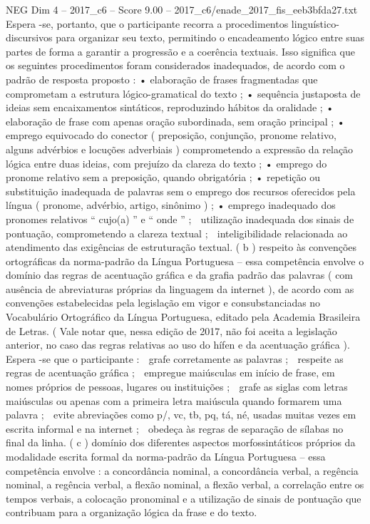 \begin{textsample}{NEG Dim 4 – 2017\_c6 – Score 9.00 – 2017\_c6/enade\_2017\_fis\_eeb3bfda27.txt}
Espera -se, portanto, que o participante recorra a procedimentos linguístico-discursivos para organizar seu texto, permitindo o encadeamento lógico entre suas partes de forma a garantir a progressão e a coerência textuais.
Isso significa que os seguintes procedimentos foram considerados inadequados, de acordo com o padrão de resposta proposto : • elaboração de frases fragmentadas que comprometam a estrutura lógico-gramatical do texto ; • sequência justaposta de ideias sem encaixamentos sintáticos, reproduzindo hábitos da oralidade ; • elaboração de frase com apenas oração subordinada, sem oração principal ; • emprego equivocado do conector ( preposição, conjunção, pronome relativo, alguns advérbios e locuções adverbiais ) comprometendo a expressão da relação lógica entre duas ideias, com prejuízo da clareza do texto ; • emprego do pronome relativo sem a preposição, quando obrigatória ; • repetição ou substituição inadequada de palavras sem o emprego dos recursos oferecidos pela língua ( pronome, advérbio, artigo, sinônimo ) ; • emprego inadequado dos pronomes relativos “ cujo(a) ” e “ onde ” ;  utilização inadequada dos sinais de pontuação, comprometendo a clareza textual ;  inteligibilidade relacionada ao atendimento das exigências de estruturação textual. ( b ) respeito às convenções ortográficas da norma-padrão da Língua Portuguesa – essa competência envolve o domínio das regras de acentuação gráfica e da grafia padrão das palavras ( com ausência de abreviaturas próprias da linguagem da internet ), de acordo com as convenções estabelecidas pela legislação em vigor e consubstanciadas no Vocabulário Ortográfico da Língua Portuguesa, editado pela Academia Brasileira de Letras. ( Vale notar que, nessa edição de 2017, não foi aceita a legislação anterior, no caso das regras relativas ao uso do hífen e da acentuação gráfica ).
Espera -se que o participante :  grafe corretamente as palavras ;  respeite as regras de acentuação gráfica ;  empregue maiúsculas em início de frase, em nomes próprios de pessoas, lugares ou instituições ;  grafe as siglas com letras maiúsculas ou apenas com a primeira letra maiúscula quando formarem uma palavra ;  evite abreviações como p/, vc, tb, pq, tá, né, usadas muitas vezes em escrita informal e na internet ;  obedeça às regras de separação de sílabas no final da linha. ( c ) domínio dos diferentes aspectos morfossintáticos próprios da modalidade escrita formal da norma-padrão da Língua Portuguesa – essa competência envolve : a concordância nominal, a concordância verbal, a regência nominal, a regência verbal, a flexão nominal, a flexão verbal, a correlação entre os tempos verbais, a colocação pronominal e a utilização de sinais de pontuação que contribuam para a organização lógica da frase e do texto.

\end{textsample}
